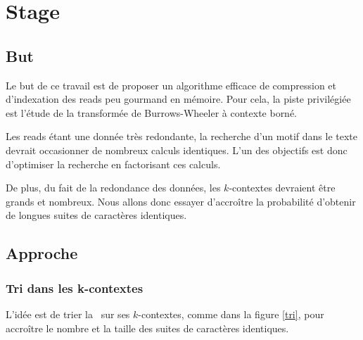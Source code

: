 \section{Stage}

\subsection{But}
Le but de ce travail est de proposer un algorithme efficace de compression et d'indexation des reads peu gourmand en mémoire. Pour cela, la piste privilégiée est l'étude de la transformée de Burrows-Wheeler à contexte borné. 

Les reads étant une donnée très redondante, la recherche d'un motif dans le texte devrait occasionner de nombreux calculs identiques. L'un des objectifs est donc d'optimiser la recherche en factorisant ces calculs. 

De plus, du fait de la redondance des données, les $k$-contextes devraient être grands et nombreux. Nous allons donc essayer d'accroître la probabilité d'obtenir de longues suites de caractères identiques.




\subsection{Approche}
\subsubsection{Tri dans les k-contextes}
L'idée est de trier la \kbwt\ sur ses $k$-contextes, comme dans la figure \ref{tri}, pour accroître le nombre et la taille des suites de caractères identiques.



